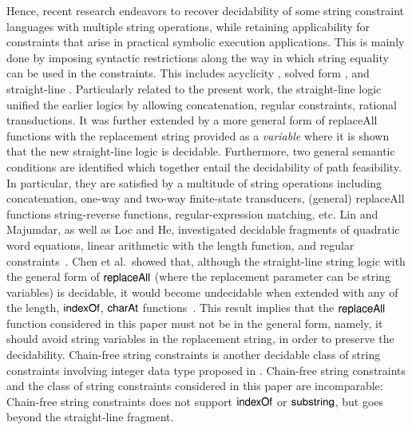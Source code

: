{Hence,  recent research endeavors %
to recover decidability of some string constraint languages with multiple string operations, while retaining applicability for constraints that
arise in practical symbolic execution applications. This is mainly done by imposing syntactic restrictions along the way in which string equality can be used in the constraints. This includes acyclicity \cite{Abdulla14,BFL13}, solved form \cite{Vijay-length}, and straight-line \cite{LB16,HJLRV18,CCH+18}.
Particularly related to the present work, the straight-line logic \cite{LB16}  unified the earlier logics by allowing concatenation, regular constraints, rational
transductions. %
It was further extended %
by a more general form of replaceAll functions with the replacement string provided as a
\emph{variable} \cite{CCH+18} where it is shown that the new straight-line logic %
is decidable.  Furthermore, two general semantic conditions are identified  \cite{CHL+19}  which together entail the decidability of path
feasibility. In particular, they are satisfied by a multitude of string operations
including concatenation, one-way and two-way finite-state transducers, (general) replaceAll functions
string-reverse functions, regular-expression matching, etc. 
}
%
Lin and Majumdar, as well as Loc and He, investigated decidable fragments of %
quadratic word equations, linear arithmetic with the length function, and regular constraints~\cite{LinM18,LeH18}. Chen et al.\ showed that, although the straight-line string logic with the general form of $\mathsf{replaceAll}$ (where the replacement parameter can be string variables) is decidable, it would become undecidable when extended with any of the length, $\mathsf{indexOf}$, $\mathsf{charAt}$ functions~\cite{CCH+18}. This result implies that the $\mathsf{replaceAll}$ function considered in this paper must not be in the general form, namely, it should avoid string variables in the replacement string, in order to preserve the decidability. Chain-free string constraints is another decidable class of string constraints involving integer data type proposed in \cite{AbdullaA+19}. Chain-free string constraints and the class of string constraints considered in this paper are incomparable: Chain-free string constraints does not support $\mathsf{indexOf}$ or $\mathsf{substring}$, but goes beyond the straight-line fragment.


